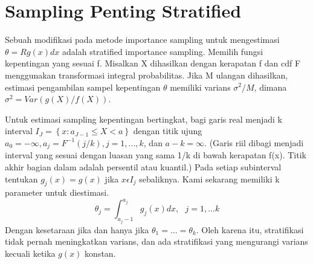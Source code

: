 \documentclass[a4paper,12pt]{article}
\theoremstyle{definition}
\begin{document}
\section{Sampling Penting Stratified}
Sebuah modifikasi pada metode importance sampling untuk mengestimasi $\theta = R g(x)dx$ adalah stratified importance sampling.
Memilih fungsi kepentingan yang sesuai f. Misalkan X dihasilkan dengan kerapatan f dan cdf F menggunakan transformasi integral probabilitas. Jika M ulangan dihasilkan, estimasi pengambilan sampel kepentingan $\theta$ memiliki varians $\sigma ^{2}/M$, dimana $\sigma^{2}=Var(g(X)/f(X))$.

Untuk estimasi sampling kepentingan bertingkat, bagi garis real menjadi k interval $I_{J}=\left \{ x:a_{J-1}\leq X<a \right \}$ dengan titik ujung $a_{0}=-\infty,a_{j}=F^{-1}(j/k),j=1,...,k$, dan $a-{k}=\infty$. (Garis riil dibagi menjadi interval yang sesuai dengan luasan yang sama 1/k di bawah kerapatan f(x). Titik akhir bagian dalam adalah persentil atau kuantil.) Pada setiap subinterval tentukan $g_{j}(x)=g(x)$ jika $x \epsilon I_{j}$ sebaliknya. Kami sekarang memiliki k parameter untuk diestimasi. 
\begin{equation*}
    \theta_{j}=\int_{a_{j}-1}^{a_{j}}g_{j}(x)dx, \ \ \ j=1,...k
\end{equation*}
Dengan kesetaraan jika dan hanya jika $\theta_{1}=...=\theta_{k}$. Oleh karena itu, stratifikasi tidak pernah meningkatkan varians, dan ada stratifikasi yang mengurangi varians kecuali ketika $g(x)$ konstan.
\end{document}
